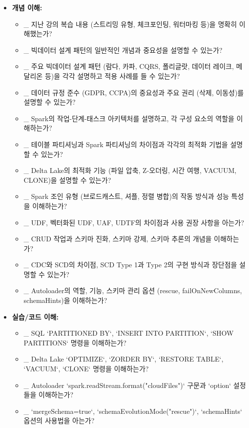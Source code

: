 \documentclass[11pt,a4paper]{article}
\begin{document}
\begin{itemize}
    \item \textbf{개념 이해:}
    \begin{itemize}
        \item \_ 지난 강의 복습 내용 (스트리밍 유형, 체크포인팅, 워터마킹 등)을 명확히 이해했는가?
        \item \_ 빅데이터 설계 패턴의 일반적인 개념과 중요성을 설명할 수 있는가?
        \item \_ 주요 빅데이터 설계 패턴 (람다, 카파, CQRS, 폴리글랏, 데이터 레이크, 메달리온 등)을 각각 설명하고 적용 사례를 들 수 있는가?
        \item \_ 데이터 규정 준수 (GDPR, CCPA)의 중요성과 주요 권리 (삭제, 이동성)를 설명할 수 있는가?
        \item \_ Spark의 작업-단계-태스크 아키텍처를 설명하고, 각 구성 요소의 역할을 이해하는가?
        \item \_ 테이블 파티셔닝과 Spark 파티셔닝의 차이점과 각각의 최적화 기법을 설명할 수 있는가?
        \item \_ Delta Lake의 최적화 기능 (파일 압축, Z-오더링, 시간 여행, VACUUM, CLONE)을 설명할 수 있는가?
        \item \_ Spark 조인 유형 (브로드캐스트, 셔플, 정렬 병합)의 작동 방식과 성능 특성을 이해하는가?
        \item \_ UDF, 벡터화된 UDF, UAF, UDTF의 차이점과 사용 권장 사항을 아는가?
        \item \_ CRUD 작업과 스키마 진화, 스키마 강제, 스키마 추론의 개념을 이해하는가?
        \item \_ CDC와 SCD의 차이점, SCD Type 1과 Type 2의 구현 방식과 장단점을 설명할 수 있는가?
        \item \_ Autoloader의 역할, 기능, 스키마 관리 옵션 (rescue, failOnNewColumns, schemaHints)을 이해하는가?
    \end{itemize}
    \item \textbf{실습/코드 이해:}
    \begin{itemize}
        \item \_ SQL `PARTITIONED BY`, `INSERT INTO PARTITION`, `SHOW PARTITIONS` 명령을 이해하는가?
        \item \_ Delta Lake `OPTIMIZE`, `ZORDER BY`, `RESTORE TABLE`, `VACUUM`, `CLONE` 명령을 이해하는가?
        \item \_ Autoloader `spark.readStream.format("cloudFiles")` 구문과 `option` 설정들을 이해하는가?
        \item \_ `mergeSchema=true`, `schemaEvolutionMode("rescue")`, `schemaHints` 옵션의 사용법을 아는가?

\end{itemize}
\end{itemize}
\end{document}
